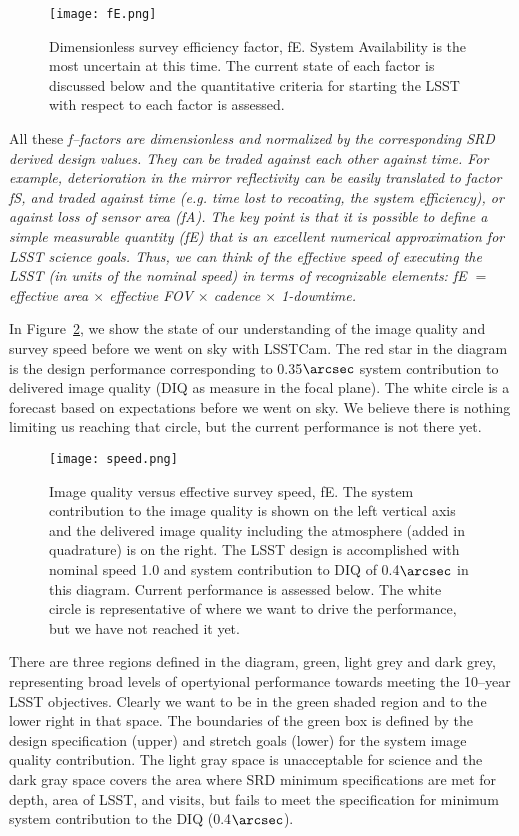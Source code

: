 \begin{figure}%
\centering
\texttt{[image: fE.png]}
\caption{Dimensionless survey efficiency factor, fE. System Availability is the most uncertain at this time. The current state of each factor is discussed below and the quantitative criteria for starting the LSST with respect to each factor is assessed.}
\label{fE}
\end{figure}

All these \it{f--factors} are dimensionless and normalized by the corresponding SRD derived design values. They can be traded against each other against time.
For example, deterioration in the mirror reflectivity can be easily translated to factor fS, and traded against time (e.g. time lost to recoating, the system efficiency), or against loss of sensor area (fA).
The key point is that it is possible to define a simple measurable quantity (fE) that is an excellent numerical approximation for LSST science goals. Thus, we can think of the effective speed of executing the LSST (in units of the nominal speed) in terms of recognizable elements:  fE $=$ effective area $\times$ effective FOV $\times$ cadence $\times$ 1-downtime.

In Figure~\ref{speed}, we show the state of our understanding of the image quality and survey speed before we went on sky with LSSTCam. The red star in the diagram is the design performance corresponding to 0.35$\arcsec$ system contribution to delivered image quality (DIQ as measure in the focal plane). The white circle is a forecast based on expectations before we went on sky. We believe there is nothing limiting us reaching that circle, but the current performance is not there yet. 

\begin{figure}[t]
\centering
\texttt{[image: speed.png]}
\caption{Image quality versus effective survey speed, fE. The system contribution to the image quality is shown on the left vertical axis and the delivered image quality including the atmosphere (added in quadrature) is on the right. The LSST design is accomplished with nominal speed 1.0 and system contribution to DIQ of 0.4$\arcsec$ in this diagram. Current performance is assessed below. The white circle is representative of where we want to drive the performance, but we have not reached it yet.}
\label{speed}
\end{figure}

There are three regions defined in the diagram, green, light grey and dark grey, representing broad levels of opertyional performance towards meeting the 10--year LSST objectives. Clearly we want to be in the green shaded region and to the lower right in that space. The boundaries of the green box is defined by the design specification (upper) and stretch goals (lower) for the system image quality contribution.  The light gray space is unacceptable for science and the dark gray space covers the area where SRD minimum specifications are met for depth, area of LSST, and visits, but fails to meet the specification for minimum system contribution to the DIQ (0.4$\arcsec$). 

